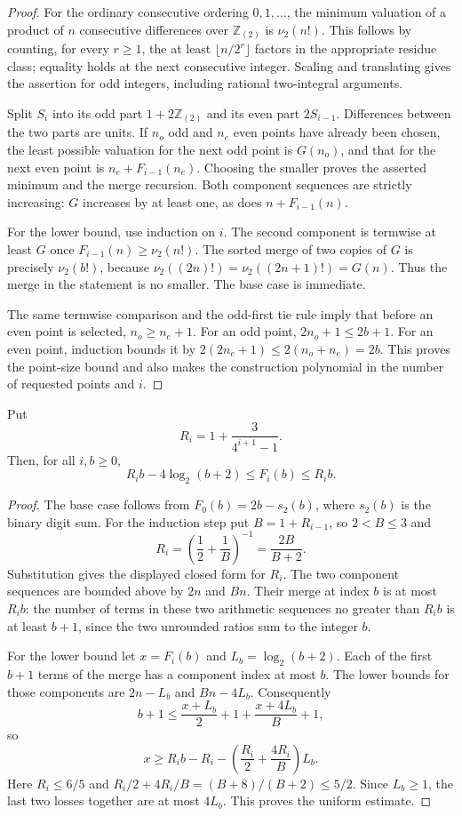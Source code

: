 \begin{proof}
For the ordinary consecutive ordering $0,1,\ldots$, the minimum
valuation of a product of $n$ consecutive differences over
$\mathbb Z_{(2)}$ is $\nu_2(n!)$. This follows by counting, for every
$r\ge1$, the at least $\lfloor n/2^r\rfloor$ factors in the appropriate
residue class; equality holds at the next consecutive integer.
Scaling and translating gives the assertion for odd integers, including
rational two-integral arguments.

Split $S_i$ into its odd part $1+2\mathbb Z_{(2)}$ and its even part
$2S_{i-1}$. Differences between the two parts are units. If $n_o$
odd and $n_e$ even points have already been chosen, the least possible
valuation for the next odd point is $G(n_o)$, and that for the next even
point is $n_e+F_{i-1}(n_e)$. Choosing the smaller proves the asserted
minimum and the merge recursion. Both component sequences are strictly
increasing: $G$ increases by at least one, as does $n+F_{i-1}(n)$.

For the lower bound, use induction on $i$. The second component is
termwise at least $G$ once $F_{i-1}(n)\ge\nu_2(n!)$. The sorted merge
of two copies of $G$ is precisely $\nu_2(b!)$, because
$\nu_2((2n)!)=\nu_2((2n+1)!)=G(n)$. Thus the merge in the statement
is no smaller. The base case is immediate.

The same termwise comparison and the odd-first tie rule imply that
before an even point is selected, $n_o\ge n_e+1$. For an odd point,
$2n_o+1\le2b+1$. For an even point, induction bounds it by
$2(2n_e+1)\le2(n_o+n_e)=2b$. This proves the point-size bound and
also makes the construction polynomial in the number of requested
points and $i$.
\end{proof}

\begin{lemma}
\label{lem:annulus-slope}
Put
\[
 R_i=1+\frac{3}{4^{i+1}-1}.
\]
Then, for all $i,b\ge0$,
\[
 R_i b-4\log_2(b+2)\le F_i(b)\le R_i b.
\]
\end{lemma}

\begin{proof}
The base case follows from
$F_0(b)=2b-s_2(b)$, where $s_2(b)$ is the binary digit sum.
For the induction step put $B=1+R_{i-1}$, so $2<B\le3$ and
\[
 R_i=\left(\frac12+\frac1B\right)^{-1}
     =\frac{2B}{B+2}.
\]
Substitution gives the displayed closed form for $R_i$.
The two component sequences are bounded above by $2n$ and $Bn$.
Their merge at index $b$ is at most $R_i b$: the number of terms in
these two arithmetic sequences no greater than $R_i b$ is at least
$b+1$, since the two unrounded ratios sum to the integer $b$.

For the lower bound let $x=F_i(b)$ and
$L_b=\log_2(b+2)$. Each of the first $b+1$ terms of the merge has a
component index at most $b$. The lower bounds for those components
are $2n-L_b$ and $Bn-4L_b$. Consequently
\[
 b+1\le \frac{x+L_b}{2}+1+\frac{x+4L_b}{B}+1,
\]
so
\[
 x\ge R_i b-R_i-\left(\frac{R_i}{2}
                      +\frac{4R_i}{B}\right)L_b.
\]
Here $R_i\le6/5$ and
$R_i/2+4R_i/B=(B+8)/(B+2)\le5/2$.
Since $L_b\ge1$, the last two losses together are at most
$4L_b$. This proves the uniform estimate.
\end{proof}

